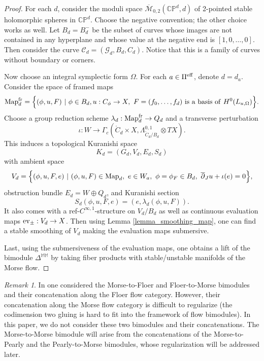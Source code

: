 \documentclass[reqno, 10pt]{amsart}
\numberwithin{equation}{section}
\numberwithin{equation}{section}
\theoremstyle{definition}
\theoremstyle{remark}
\newtheorem{rem}[thm]{Remark}
\newcommand{\beqn}{\begin{equation*}}
\newcommand{\eeqn}{\end{equation*}}
\newcommand{\ov}{\overline}
\newcommand{\mb}{\mathbb}
\newcommand{\mc}{\mathcal}
\newcommand{\ev}{{\rm ev}}
\begin{document}
\begin{proof}
For each $d$, consider the moduli space $\ov{\mc M}_{0,2}(\mb{CP}^d, d)$ of 2-pointed stable holomorphic spheres in $\mb{CP}^d$. Choose the negative convention; the other choice works as well. Let $B_d = B_d^-$ be the subset of curves whose images are not contained in any hyperplane and whose value at the negative end is $[1, 0, \ldots, 0]$. Then consider the curve ${\mc C}_d = ({\mc G}_d, B_d, C_d)$. Notice that this is a family of curves without boundary or corners. 

Now choose an integral symplectic form $\Omega$. For each $a \in \Pi^{\rm eff}$, denote $d = d_a$. Consider the space of framed maps
\beqn
{\rm Map}_d^{\rm fr} = \Big\{ (\phi, u, F)\ |\ \phi \in B_d, u: C_\phi \to X,\ F = (f_0, \ldots, f_d)\ {\rm is\ a\ basis\ of\ } H^0(L_{u, \Omega}) \Big\}.
\eeqn
Choose a group reduction scheme $\lambda_d: {\rm Map}_d^{\rm fr} \to Q_d$ and a transverse perturbation 
\beqn
\iota: W \to \Gamma_c( \mathring C_d \times X, \Lambda^{0,1}_{\mathring C_d / B_d} \otimes TX).
\eeqn
This induces a topological Kuranishi space 
\beqn
K_d = (G_d, V_d, E_d, S_d)
\eeqn
with ambient space
\beqn
V_d = \Big\{ (\phi, u, F, e)\ |\ (\phi, u, F) \in {\rm Map}_d,\ e \in W_a,\ \phi = \phi_F \in B_d,\ \ov\partial_J u + \iota (e) = 0    \Big\},
\eeqn
obstruction bundle $E_d = W \oplus Q_d$, and Kuranishi section 
\beqn
S_d (\phi, u, F, e) = (e, \lambda_d (\phi, u, F)).
\eeqn
It also comes with a {\rm ref}-$C^{\infty, 1}$-structure on $V_d/B_d$ as well as continuous evaluation maps $\ev_\pm: V_d \to X$. Then using Lemma \ref{lemma_smoothing_map}, one can find a stable smoothing of $V_d$ making the evaluation maps submersive.

Last, using the submersiveness of the evaluation maps, one obtains a lift of the bimodule $\mb{\Delta}^{\mb{MM}}$ by taking fiber products with stable/unstable manifolds of the Morse flow.
\end{proof}


\begin{rem}
In \cite{Bai_Xu_Arnold} one considered the Morse-to-Floer and Floer-to-Morse bimodules and their concatenation along the Floer flow category. However, their concatenation along the Morse flow category is difficult to regularize (the codimension two gluing is hard to fit into the framework of flow bimodules). In this paper, we do not consider these two bimodules and their concatenations. The Morse-to-Morse bimodule will arise from the concatenations of the Morse-to-Pearly and the Pearly-to-Morse bimodules, whose regularization will be addressed later.
\end{rem}
\end{document}
